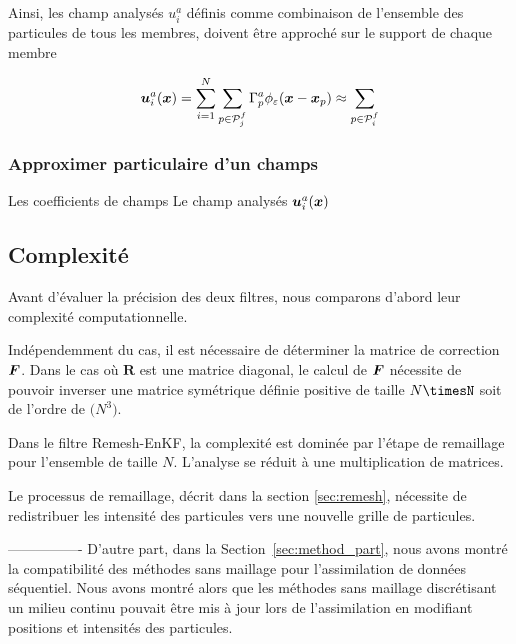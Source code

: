 \begin{itemize}
Ainsi, les champ analysés $u_i^a$ définis comme combinaison de l'ensemble des particules de tous les membres, doivent être approché sur le support de chaque membre

\begin{eqnarray*}
    \bm{u}_i^a(\bm{x}) =  \sum_{i=1}^{N} \sum_{p \in \mathcal{P}_j^f} \Gamma^a_p \phi_{\varepsilon}(\bm{x} - \bm{x}_p)\approx \sum _{p \in \mathcal{P}_i^f}
\end{eqnarray*}

\subsubsection{Approximer particulaire d'un champs}

Les coefficients de champs Le champ analysés $\bm{u}_i^a(\bm{x})$

\subsection{Complexité}

Avant d'évaluer la précision des deux filtres, nous comparons d'abord leur complexité computationnelle.

Indépendemment du cas, il est nécessaire de déterminer la matrice de correction $\bm{F}$. Dans le cas où $\bm R$ est une matrice diagonal, le calcul de $\bm{F}$ nécessite de pouvoir inverser une matrice symétrique définie positive de taille $N\timesN$ soit de l'ordre de $\mathcal(N^3)$.

Dans le filtre Remesh-EnKF, la complexité est dominée par l'étape de remaillage pour l'ensemble de taille $N$. L'analyse se réduit à une multiplication de matrices.

Le processus de remaillage, décrit dans la section \ref{sec:remesh}, nécessite de redistribuer les intensité des particules vers une nouvelle grille de particules.











----------------
D'autre part, dans la Section~\ref{sec:method_part}, nous avons montré la compatibilité des méthodes sans maillage pour l'assimilation de données séquentiel. Nous avons montré alors que les méthodes sans maillage discrétisant un milieu continu pouvait être mis à jour lors de l'assimilation en modifiant positions et intensités des particules.


\end{itemize}
